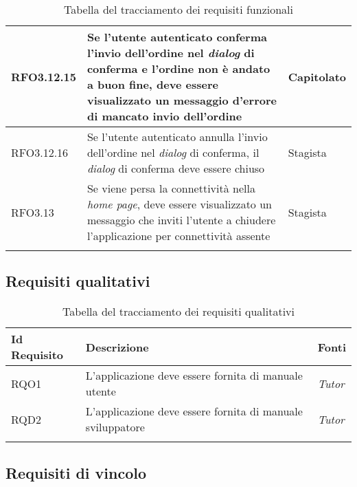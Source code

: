 {\begin{center}
\begin{longtable}{ | >{\centering\arraybackslash}p{2.5cm} | >{\arraybackslash}p{7cm} | >{\centering\arraybackslash}p{2cm} | }
RFO3.12.15 & Se l'utente autenticato conferma l'invio dell'ordine nel \textit{dialog} di conferma e l'ordine non è andato a buon fine, deve essere visualizzato un messaggio d'errore di mancato invio dell'ordine & Capitolato \\ \hline
RFO3.12.16 & Se l'utente autenticato annulla l'invio dell'ordine nel \textit{dialog} di conferma, il \textit{dialog} di conferma deve essere chiuso & Stagista \\ \hline
RFO3.13 & Se viene persa la connettività nella \textit{home page}, deve essere visualizzato un messaggio che inviti l'utente a chiudere l'applicazione per connettività assente & Stagista \\
\hline
\caption{Tabella del tracciamento dei requisiti funzionali}
\end{longtable}
\end{center}}

\newpage

\subsection{Requisiti qualitativi}

{\renewcommand{\arraystretch}{2}
\begin{center}
\begin{longtable}{ | >{\centering\arraybackslash}p{2.5cm} | >{\arraybackslash}p{7cm} | >{\centering\arraybackslash}p{2cm} | }
\hline
\textbf{Id Requisito} & \textbf{Descrizione} & \textbf{Fonti} \\ \hline
\endhead
RQO1 & L'applicazione deve essere fornita di manuale utente & \textit{Tutor} \\ \hline
RQD2 & L'applicazione deve essere fornita di manuale sviluppatore & \textit{Tutor} \\ \hline
\caption{Tabella del tracciamento dei requisiti qualitativi}
\end{longtable}
\end{center}}

\newpage

\subsection{Requisiti di vincolo}

